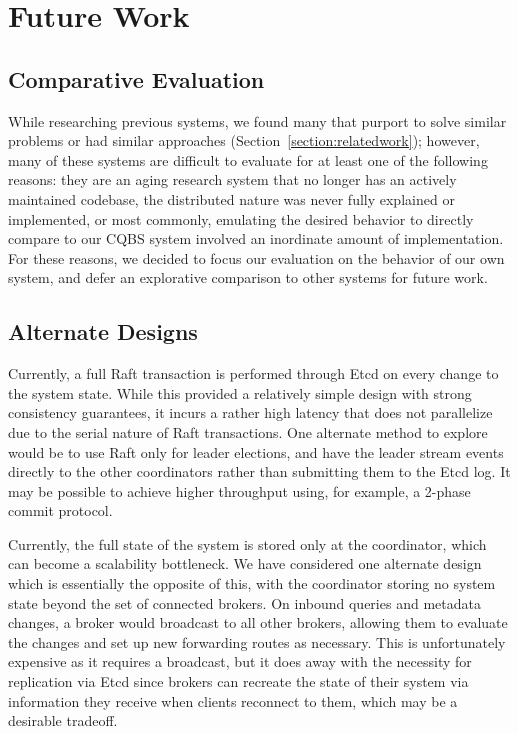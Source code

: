 \section{Future Work}

\subsection{Comparative Evaluation}

While researching previous systems, we found many that purport to solve similar problems or had similar approaches (Section~\ref{section:relatedwork}); however, many of these systems are difficult to evaluate for at least one of the following reasons: they are an aging research system that no longer has an actively maintained codebase, the distributed nature was never fully explained or implemented, or most commonly, emulating the desired behavior to directly compare to our CQBS system involved an inordinate amount of implementation.
For these reasons, we decided to focus our evaluation on the behavior of our own system, and defer an explorative comparison to other systems for future work.

\subsection{Alternate Designs}
\label{subsec:alternate_designs}


Currently, a full Raft transaction is performed through Etcd on every change to the system state.
While this provided a relatively simple design with strong consistency guarantees, it incurs a rather high latency that does not parallelize due to the serial nature of Raft transactions.
One alternate method to explore would be to use Raft only for leader elections, and have the leader stream events directly to the other coordinators rather than submitting them to the Etcd log.
It may be possible to achieve higher throughput using, for example, a 2-phase commit protocol.

Currently, the full state of the system is stored only at the coordinator, which can become a scalability bottleneck.
We have considered one alternate design which is essentially the opposite of this, with the coordinator storing no system state beyond the set of connected brokers.
On inbound queries and metadata changes, a broker would broadcast to all other brokers, allowing them to evaluate the changes and set up new forwarding routes as necessary.
This is unfortunately expensive as it requires a broadcast, but it does away with the necessity for replication via Etcd since brokers can recreate the state of their system via information they receive when clients reconnect to them, which may be a desirable tradeoff.

